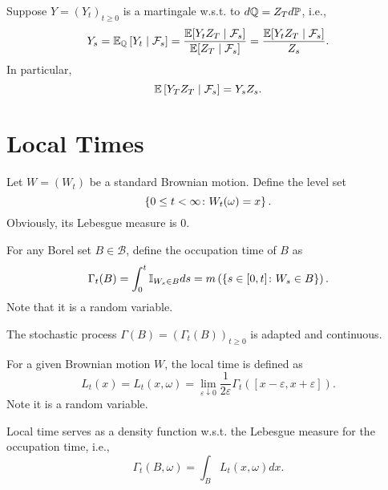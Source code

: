 \begin{rmk}
    Suppose $Y=(Y_t)_{t \geq 0}$ is a martingale w.s.t. to $d\mathbb{Q} = Z_T d\mathbb{P}$, i.e.,
    \begin{equation*}
        Y_s = \mathbb{E}_{\mathbb{Q}}\left[Y_t \mid \mathcal{F}_s\right] = \frac{\mathbb{E}[Y_tZ_T \mid \mathcal{F}_s]}{\mathbb{E}[Z_T \mid \mathcal{F}_s]} = \frac{\mathbb{E}[Y_tZ_T \mid \mathcal{F}_s]}{Z_s}.
    \end{equation*}
    In particular,
    \begin{equation*}
        \mathbb{E}\left[Y_TZ_T \mid \mathcal{F}_s\right] = Y_sZ_s.
    \end{equation*}
\end{rmk}

\section{Local Times}

Let $W=(W_t)$ be a standard Brownian motion. Define the level set
\begin{equation*}
    \left\{0 \leq t < \infty \colon W_t(\omega) = x\right\}.
\end{equation*}
Obviously, its Lebesgue measure is $0$.

\begin{defn}
    For any Borel set $B \in \mathcal{B}$, define the occupation time of $B$ as
    \begin{equation*}
        \Gamma_t(B) = \int_0^t \mathbb{I}_{W_s \in B} ds = m\left(\left\{ s \in [0,t] \colon W_s \in B \right\}\right).
    \end{equation*}
    Note that it is a random variable.
\end{defn}
\begin{rmk}
    The stochastic process $\Gamma(B) = (\Gamma_t(B))_{t\geq 0}$ is adapted and continuous.
\end{rmk}

\begin{defn}
    For a given Brownian motion $W$, the local time is defined as
    \begin{equation*}
        L_t(x) = L_t(x,\omega) = \lim_{\varepsilon \downarrow 0} \frac{1}{2\varepsilon}\Gamma_t([x-\varepsilon,x+\varepsilon]).
    \end{equation*}
    Note it is a random variable.
\end{defn}
\begin{rmk}
    Local time serves as a density function  w.s.t. the Lebesgue measure for the occupation time, i.e.,
    \begin{equation*}
        \Gamma_t(B,\omega) = \int_B L_t(x,\omega)dx.
    \end{equation*}
\end{rmk}

